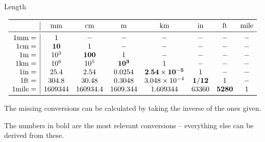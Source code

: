 \begin{table}[h]
  \label{table:length-conversion}
  \caption{Length}

  \begin{threeparttable}
    \[
    \begin{array}{ r|ccccccc }
      \toprule
              &  \si{mm}      & \si{cm}   & \si{m}    & \si{km}         &\si{in}&\si{ft}& \si{mile} \\
      \midrule
      1 \si{mm}    = &1       & -         & -         & -               & -     & -     & - \\
      1 \si{cm}    = &\mathbf{10}      & 1         & -         & -               & -     & -     & - \\
      1 \si{m}     = &10^3    & \mathbf{100}       & 1         & -               & -     & -     & - \\
      1 \si{km}    = &10^6    & 10^{5}    & \mathbf{10^{3}}    & 1               & -     & -     & - \\
      1 \si{in}    = &25.4    & 2.54      & 0.0254    & \mathbf{2.54 \x10^{-5}}  & 1     & -     & - \\
      1 \si{ft}    = &304.8   & 30.48     & 0.3048    & 3.048 \x10^{-4} & \mathbf{1/12}  & 1     & - \\
      1 \si{mile}  = &1609344 & 160934.4  & 1609.344  & 1.609344        & 63360 & \mathbf{5280}  & 1 \\
      \bottomrule
    \end{array}
    \]

    \begin{tablenotes}
      \small
      \item The missing conversions can be calculated by taking the inverse of the ones given.
      \item The numbers in bold are the most relevant conversions -- everything else can be derived from these.
    \end{tablenotes}
  \end{threeparttable}

\end{table}
